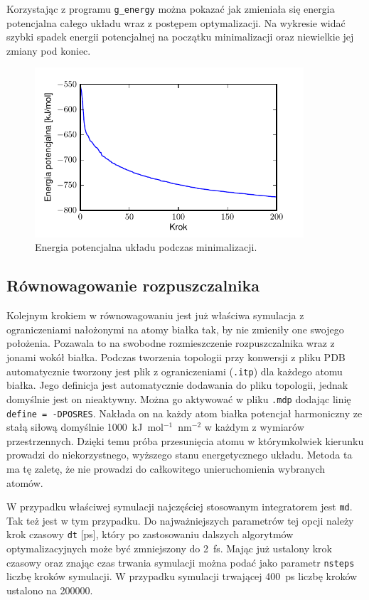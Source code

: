 Korzystając z programu \texttt{g\_energy} można pokazać jak zmieniała się energia potencjalna całego układu wraz z postępem optymalizacji. Na wykresie widać szybki spadek energii potencjalnej na początku minimalizacji oraz niewielkie jej zmiany pod koniec.

\begin{figure}[h]
\begin{centering}
\includegraphics[width=100mm]{./rys/em_pot.pdf}
\caption{Energia potencjalna układu podczas minimalizacji.}
\end{centering}
\end{figure}

\subsection{Równowagowanie rozpuszczalnika}

Kolejnym krokiem w równowagowaniu jest już właściwa symulacja z ograniczeniami nałożonymi na atomy białka tak, by nie zmieniły one swojego położenia. Pozawala to na swobodne rozmieszczenie rozpuszczalnika wraz z jonami wokół białka. Podczas tworzenia topologii przy konwersji z pliku PDB automatycznie tworzony jest plik z ograniczeniami (\texttt{.itp}) dla każdego atomu białka. Jego definicja jest automatycznie dodawania do pliku topologii, jednak domyślnie jest on nieaktywny. Można go aktywować w pliku \texttt{.mdp} dodając linię \texttt{define = -DPOSRES}. Nakłada on na każdy atom białka potencjał harmoniczny ze stałą siłową domyślnie 1000~kJ~mol$^{-1}$~nm$^{-2}$ w każdym z wymiarów przestrzennych. Dzięki temu próba przesunięcia atomu w którymkolwiek kierunku prowadzi do niekorzystnego, wyższego stanu energetycznego układu. Metoda ta ma tę zaletę, że nie prowadzi do całkowitego unieruchomienia wybranych atomów. 

W przypadku właściwej symulacji najczęściej stosowanym integratorem jest \texttt{md}. Tak też jest w tym przypadku. Do najważniejszych parametrów tej opcji należy krok czasowy \texttt{dt} [ps], który po zastosowaniu dalszych algorytmów optymalizacyjnych może być zmniejszony do 2~fs. Mając już ustalony krok czasowy oraz znając czas trwania symulacji można podać jako parametr \texttt{nsteps} liczbę kroków symulacji. W przypadku symulacji trwającej 400~ps liczbę kroków ustalono na 200000. 

